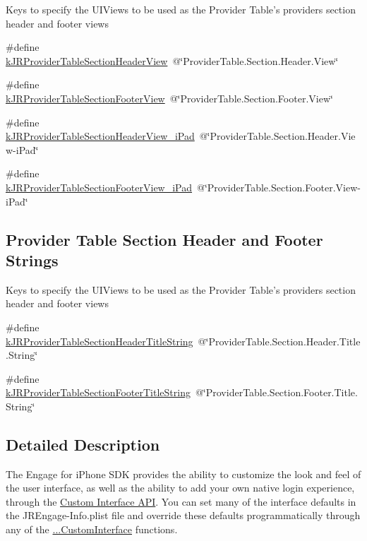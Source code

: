 Keys to specify the UIViews to be used as the Provider Table's providers section header and footer views \begin{DoxyCompactItemize}
\item 
\#define \hyperlink{group__custom_interface_gaaff8ebdd2b9badb1d0a019a71d47db46}{kJRProviderTableSectionHeaderView}~@\char`\"{}ProviderTable.Section.Header.View\char`\"{}
\item 
\#define \hyperlink{group__custom_interface_ga984c096e9258dea402a1c27ae8bb6c8f}{kJRProviderTableSectionFooterView}~@\char`\"{}ProviderTable.Section.Footer.View\char`\"{}
\item 
\#define \hyperlink{group__custom_interface_ga7dcb3488390fabe1f3a358fb5af1e42c}{kJRProviderTableSectionHeaderView\_\-iPad}~@\char`\"{}ProviderTable.Section.Header.View-\/iPad\char`\"{}
\item 
\#define \hyperlink{group__custom_interface_gaa2196cc44d4e0dc4de9e98248c8a7e10}{kJRProviderTableSectionFooterView\_\-iPad}~@\char`\"{}ProviderTable.Section.Footer.View-\/iPad\char`\"{}
\end{DoxyCompactItemize}
\subsection*{Provider Table Section Header and Footer Strings}
\label{_amgrp04b2524ada266b7d80839ac3b6e6ae59}
 \label{group__custom_interface_tableSectionStrings}
\hypertarget{group__custom_interface_tableSectionStrings}{}


Keys to specify the UIViews to be used as the Provider Table's providers section header and footer views \begin{DoxyCompactItemize}
\item 
\#define \hyperlink{group__custom_interface_ga667a6c955993ec24292875f319a7d763}{kJRProviderTableSectionHeaderTitleString}~@\char`\"{}ProviderTable.Section.Header.Title.String\char`\"{}
\item 
\#define \hyperlink{group__custom_interface_ga72e63105251e7d4d6a363e279c2bf775}{kJRProviderTableSectionFooterTitleString}~@\char`\"{}ProviderTable.Section.Footer.Title.String\char`\"{}
\end{DoxyCompactItemize}


\subsection{Detailed Description}
The Engage for iPhone SDK provides the ability to customize the look and feel of the user interface, as well as the ability to add your own native login experience, through the \hyperlink{interface_j_r_engage_customInterface}{Custom Interface API}. You can set many of the interface defaults in the JREngage-\/Info.plist file and override these defaults programmatically through any of the \hyperlink{interface_j_r_engage_showMethods}{...CustomInterface} functions.

